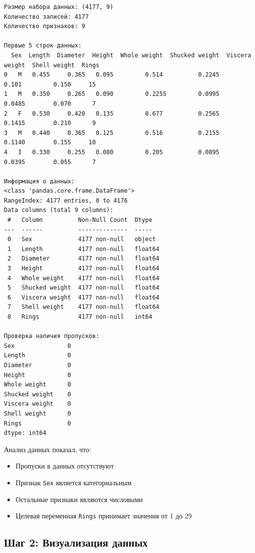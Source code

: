 \begin{verbatim}
Размер набора данных: (4177, 9)
Количество записей: 4177
Количество признаков: 9

Первые 5 строк данных:
  Sex  Length  Diameter  Height  Whole weight  Shucked weight  Viscera weight  Shell weight  Rings
0   M   0.455     0.365   0.095         0.514          0.2245           0.101         0.150     15
1   M   0.350     0.265   0.090         0.2255         0.0995          0.0485        0.070      7
2   F   0.530     0.420   0.135         0.677          0.2565          0.1415        0.210      9
3   M   0.440     0.365   0.125         0.516          0.2155          0.1140        0.155     10
4   I   0.330     0.255   0.080         0.205          0.0895          0.0395        0.055      7

Информация о данных:
<class 'pandas.core.frame.DataFrame'>
RangeIndex: 4177 entries, 0 to 4176
Data columns (total 9 columns):
 #   Column          Non-Null Count  Dtype  
---  ------          --------------  -----  
 0   Sex             4177 non-null   object 
 1   Length          4177 non-null   float64
 2   Diameter        4177 non-null   float64
 3   Height          4177 non-null   float64
 4   Whole weight    4177 non-null   float64
 5   Shucked weight  4177 non-null   float64
 6   Viscera weight  4177 non-null   float64
 7   Shell weight    4177 non-null   float64
 8   Rings           4177 non-null   int64  

Проверка наличия пропусков:
Sex               0
Length            0
Diameter          0
Height            0
Whole weight      0
Shucked weight    0
Viscera weight    0
Shell weight      0
Rings             0
dtype: int64
\end{verbatim}

Анализ данных показал, что:
\begin{itemize}
    \item Пропуски в данных отсутствуют
    \item Признак \texttt{Sex} является категориальным
    \item Остальные признаки являются числовыми
    \item Целевая переменная \texttt{Rings} принимает значения от 1 до 29
\end{itemize}

\subsection{Шаг 2: Визуализация данных}

